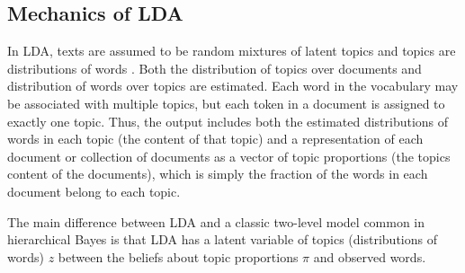 \documentclass{article}
\begin{document}
\subsection{Mechanics of LDA}
In LDA,  texts are assumed to be random mixtures of latent topics and topics are distributions of words  \citep{Blei2003}. Both the distribution of topics over documents and distribution of words over topics are estimated. Each word in the vocabulary may be associated with multiple topics, but each token in a document is assigned to exactly one topic. Thus, the output includes both the estimated distributions of words in each topic (the content of that topic) and a representation of each document or collection of documents as a vector of topic proportions (the topics content of the documents), which is simply the fraction of the words in each document belong to each topic. %

The main difference between LDA and a classic two-level model common in hierarchical Bayes is that LDA has a latent variable of topics (distributions of words) $z$ between the beliefs about topic proportions $\pi$ and observed words. 
\end{document}

